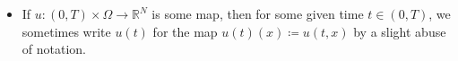 \begin{itemize}[leftmargin=*]
		\item 
		If $ u \colon ( 0 , T ) \times \Omega \to \mathbb{ R }^{ N } $ is some 
		map, then for some given time $ t \in ( 0 , T ) $, we sometimes write $ 
		u ( t ) $ for the map $ u ( t ) ( x ) \coloneqq u ( t , x ) $ by a 
		slight abuse of notation.
	\end{itemize}
